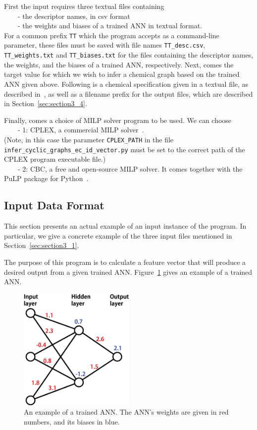 \documentclass[11pt, titlepage, dvipdfmx, twoside]{article}
\begin{document}
First
the input requires three textual files containing \\
~~~~- the descriptor names, in csv format \\
~~~~- the weights and biases of a trained ANN in textual format.\\
For a common prefix {\tt TT} which the program accepts as a command-line parameter,
these files must be saved with file names {\tt TT\_desc.csv}, 
{\tt TT\_weights.txt} and {\tt TT\_biases.txt} for the files containing
the descriptor names, the weights, and the biases of a trained ANN, respectively.
%
Next, comes the target value for which we wish to infer 
a chemical graph based on the trained ANN given above.
Following is a chemical specification given in a textual file,
as described in~\cite{cyclic_BH_arxiv}, 
as well as a filename prefix for the output files,  which are described in Section~\ref{sec:section3_4}. 

Finally, comes a choice of MILP solver program to be used.
We can choose \\
~~~~- 1: CPLEX, a commercial MILP solver~\cite{cplex}. \\
(Note, in this case the parameter {\tt CPLEX\_PATH} in the file {\tt infer\_cyclic\_graphs\_ec\_id\_vector.py}
must be set to the correct path of the CPLEX program executable file.) \\
~~~~- 2: CBC, a free and open-source MILP solver. It comes together with the PuLP package for Python~\cite{PuLP1}.




\subsection{Input Data Format}
\label{sec:section3_2}

This section presents an actual example of an input instance of the program.
In particular, we give a concrete example of the three input files
mentioned in Section~\ref{sec:section3_1}.

The purpose of this program is to calculate a feature vector that will produce a desired output from a 
given trained ANN.
Figure~\ref{fig:sample} gives an example of a trained ANN.


\begin{figure}[H]
  \centering
  \includegraphics[width=0.5\textwidth]{./fig/ANN_sample_en}
  \caption{An example of a trained ANN.
		      The ANN's weights are given in red numbers, and
		      its biases in blue.
		    }
  \label{fig:sample}
\end{figure}
\end{document}
